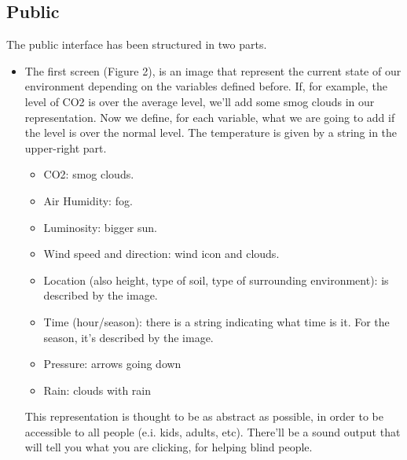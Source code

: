 \documentclass[12pt]{article} %
\begin{document}
\subsection{Public}
The public interface has been structured in two parts. 
\begin{itemize}
\item The first screen (Figure 2), is an image that represent the current state of our  environment depending on the variables defined before. If, for example, the level of CO2 is over the average level, we'll add some smog clouds in our representation. Now we define, for each variable, what we are going to add if the level is over the normal level. The temperature is given by a string in the upper-right part.
\begin{itemize}
\item CO2: smog clouds.
\item Air Humidity: fog.
\item Luminosity: bigger sun.
\item Wind speed and direction: wind icon and clouds.
\item Location (also height, type of soil, type of surrounding environment): is described by the image.
\item Time (hour/season): there is a string indicating what time is it. For the season, it's described by the image.
\item Pressure: arrows going down
\item Rain: clouds with rain
\end{itemize} 

This representation is thought to be as abstract as possible, in order to be accessible to all people (e.i. kids, adults, etc).
There'll be a sound output that will tell you what you are clicking, for helping blind people.


\end{itemize}
\end{document}
